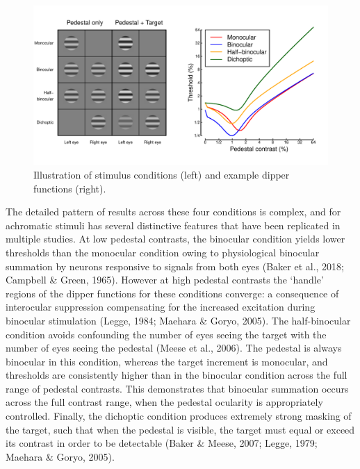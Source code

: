 \documentclass[
]{article}
\begin{document}
\begin{figure}

{\centering \includegraphics{Figures/exampledips} 

}

\caption{Illustration of stimulus conditions (left) and example dipper functions (right).}\label{fig:exampledips}
\end{figure}

The detailed pattern of results across these four conditions is complex, and for achromatic stimuli has several distinctive features that have been replicated in multiple studies. At low pedestal contrasts, the binocular condition yields lower thresholds than the monocular condition owing to physiological binocular summation by neurons responsive to signals from both eyes (Baker et al., 2018; Campbell \& Green, 1965). However at high pedestal contrasts the `handle' regions of the dipper functions for these conditions converge: a consequence of interocular suppression compensating for the increased excitation during binocular stimulation (Legge, 1984; Maehara \& Goryo, 2005). The half-binocular condition avoids confounding the number of eyes seeing the target with the number of eyes seeing the pedestal (Meese et al., 2006). The pedestal is always binocular in this condition, whereas the target increment is monocular, and thresholds are consistently higher than in the binocular condition across the full range of pedestal contrasts. This demonstrates that binocular summation occurs across the full contrast range, when the pedestal ocularity is appropriately controlled. Finally, the dichoptic condition produces extremely strong masking of the target, such that when the pedestal is visible, the target must equal or exceed its contrast in order to be detectable (Baker \& Meese, 2007; Legge, 1979; Maehara \& Goryo, 2005).
\end{document}
